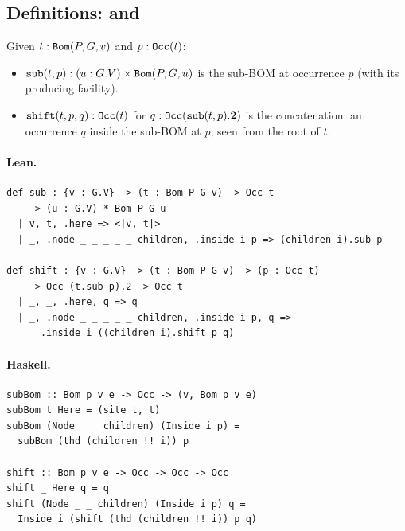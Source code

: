 \documentclass[11pt,a4paper]{article}
\begin{document}
\subsection{Definitions:  and }

\begin{defn}
Given $t : \texttt{Bom}(P, G, v)$ and $p : \texttt{Occ}(t)$:
\begin{itemize}
  \item $\texttt{sub}(t, p) : (u : G.V) \times \texttt{Bom}(P, G, u)$ is the
    sub-BOM at occurrence $p$ (with its producing facility).
  \item $\texttt{shift}(t, p, q) : \texttt{Occ}(t)$ for $q :
    \texttt{Occ}(\texttt{sub}(t, p).\mathbf{2})$ is the concatenation: an occurrence
    $q$ inside the sub-BOM at $p$, seen from the root of $t$.
\end{itemize}
\end{defn}

\paragraph{Lean.}
\begin{lstlisting}[style=lean]
def sub : {v : G.V} -> (t : Bom P G v) -> Occ t
    -> (u : G.V) * Bom P G u
  | v, t, .here => <|v, t|>
  | _, .node _ _ _ _ _ children, .inside i p => (children i).sub p

def shift : {v : G.V} -> (t : Bom P G v) -> (p : Occ t)
    -> Occ (t.sub p).2 -> Occ t
  | _, _, .here, q => q
  | _, .node _ _ _ _ _ children, .inside i p, q =>
      .inside i ((children i).shift p q)
\end{lstlisting}

\paragraph{Haskell.}
\begin{lstlisting}[style=haskell]
subBom :: Bom p v e -> Occ -> (v, Bom p v e)
subBom t Here = (site t, t)
subBom (Node _ _ children) (Inside i p) =
  subBom (thd (children !! i)) p

shift :: Bom p v e -> Occ -> Occ -> Occ
shift _ Here q = q
shift (Node _ _ children) (Inside i p) q =
  Inside i (shift (thd (children !! i)) p q)
\end{lstlisting}


\end{document}
